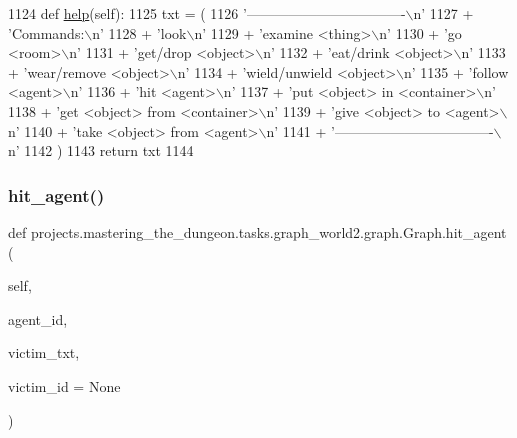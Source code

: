 \begin{DoxyCode}
1124     \textcolor{keyword}{def }\hyperlink{namespaceparlai_1_1agents_1_1tfidf__retriever_1_1build__tfidf_a078522f7d10d021f5e4855b140fc9666}{help}(self):
1125         txt = (
1126             \textcolor{stringliteral}{'----------------------------------\(\backslash\)n'}
1127             + \textcolor{stringliteral}{'Commands:\(\backslash\)n'}
1128             + \textcolor{stringliteral}{'look\(\backslash\)n'}
1129             + \textcolor{stringliteral}{'examine <thing>\(\backslash\)n'}
1130             + \textcolor{stringliteral}{'go <room>\(\backslash\)n'}
1131             + \textcolor{stringliteral}{'get/drop <object>\(\backslash\)n'}
1132             + \textcolor{stringliteral}{'eat/drink <object>\(\backslash\)n'}
1133             + \textcolor{stringliteral}{'wear/remove <object>\(\backslash\)n'}
1134             + \textcolor{stringliteral}{'wield/unwield <object>\(\backslash\)n'}
1135             + \textcolor{stringliteral}{'follow <agent>\(\backslash\)n'}
1136             + \textcolor{stringliteral}{'hit <agent>\(\backslash\)n'}
1137             + \textcolor{stringliteral}{'put <object> in <container>\(\backslash\)n'}
1138             + \textcolor{stringliteral}{'get <object> from <container>\(\backslash\)n'}
1139             + \textcolor{stringliteral}{'give <object> to <agent>\(\backslash\)n'}
1140             + \textcolor{stringliteral}{'take <object> from <agent>\(\backslash\)n'}
1141             + \textcolor{stringliteral}{'----------------------------------\(\backslash\)n'}
1142         )
1143         \textcolor{keywordflow}{return} txt
1144 
\end{DoxyCode}
\mbox{\label{classprojects_1_1mastering__the__dungeon_1_1tasks_1_1graph__world2_1_1graph_1_1Graph_a8709bca6f375c14cbfaa578228f94fcb}} 
\subsubsection{\texorpdfstring{hit\+\_\+agent()}{hit\_agent()}}
{\footnotesize\ttfamily def projects.\+mastering\+\_\+the\+\_\+dungeon.\+tasks.\+graph\+\_\+world2.\+graph.\+Graph.\+hit\+\_\+agent (\begin{DoxyParamCaption}\item[{}]{self,  }\item[{}]{agent\+\_\+id,  }\item[{}]{victim\+\_\+txt,  }\item[{}]{victim\+\_\+id = {\ttfamily None} }\end{DoxyParamCaption})}



